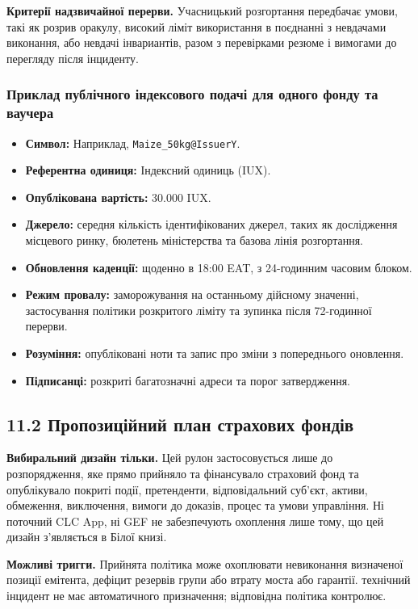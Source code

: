 \documentclass[11pt]{article}
\begin{document}
\textbf{Критерії надзвичайної перерви.} Учасницький розгортання передбачає умови, такі як розрив оракулу, високий ліміт використання в поєднанні з невдачами виконання, або невдачі інвариантів, разом з перевірками резюме і вимогами до перегляду після інциденту.

\subsubsection*{Приклад публічного індексового подачі для одного фонду та ваучера}

\begin{itemize}[leftmargin=*]
\item \textbf{Символ:} Наприклад, \texttt{Maize\_50kg@IssuerY}.
\item \textbf{Референтна одиниця:} Індексний одиниць (IUX).
\item \textbf{Опублікована вартість:} 30.000 IUX.
\item \textbf{Джерело:} середня кількість ідентифікованих джерел, таких як дослідження місцевого ринку, бюлетень міністерства та базова лінія розгортання.
\item \textbf{Обновлення каденції:} щоденно в 18:00 EAT, з 24-годинним часовим блоком.
\item \textbf{Режим провалу:} заморожування на останньому дійсному значенні, застосування політики розкритого ліміту та зупинка після 72-годинної перерви.
\item \textbf{Розуміння:} опубліковані ноти та запис про зміни з попереднього оновлення.
\item \textbf{Підписанці:} розкриті багатозначні адреси та порог затвердження.
\end{itemize}
\subsection*{11.2 Пропозиційний план страхових фондів}

\textbf{Вибиральний дизайн тільки.} Цей рулон застосовується лише до розпорядження, яке прямо прийняло та фінансувало страховий фонд та опублікувало покриті події, претенденти, відповідальний суб'єкт, активи, обмеження, виключення, вимоги до доказів, процес та умови управління. Ні поточний CLC App, ні GEF не забезпечують охоплення лише тому, що цей дизайн з'являється в Білої книзі.

\textbf{Можливі тригги.} Прийнята політика може охоплювати невиконання визначеної позиції емітента, дефіцит резервів групи або втрату моста або гарантії. технічний інцидент не має автоматичного призначення; відповідна політика контролює.
\end{document}
